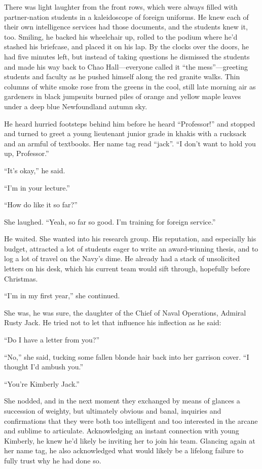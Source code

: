 \documentclass[11pt,a5paper]{article}
\begin{document}
There was light laughter from the front rows, which were always filled with partner-nation students in a kaleidoscope of foreign uniforms. He knew each of their own intelligence services had those documents, and the students knew it, too. Smiling, he backed his wheelchair up, rolled to the podium where he'd stashed his briefcase, and placed it on his lap. By the clocks over the doors, he had five minutes left, but instead of taking questions he dismissed the students and made his way back to Chao Hall---everyone called it ``the mess''---greeting students and faculty as he pushed himself along the red granite walks. Thin columns of white smoke rose from the greens in the cool, still late morning air as gardeners in black jumpsuits burned piles of orange and yellow maple leaves under a deep blue Newfoundland autumn sky.

He heard hurried footsteps behind him before he heard ``Professor!'' and stopped and turned to greet a young lieutenant junior grade in khakis with a rucksack and an armful of textbooks. Her name tag read ``{\sc jack}''. ``I don't want to hold you up, Professor.''

``It's okay,'' he said.

``I'm in your lecture.''

``How do like it so far?''

She laughed. ``Yeah, so far so good. I'm training for foreign service.''

He waited. She wanted into his research group. His reputation, and especially his budget, attracted a lot of students eager to write an award-winning thesis, and to log a lot of travel on the Navy's dime. He already had a stack of unsolicited letters on his desk, which his current team would sift through, hopefully before Christmas.

``I'm in my first year,'' she continued.

She was, he was sure, the daughter of the Chief of Naval Operations, Admiral Rusty Jack. He tried not to let that influence his inflection as he said:

``Do I have a letter from you?''

``No,'' she said, tucking some fallen blonde hair back into her garrison cover. ``I thought I'd ambush you.''

``You're Kimberly Jack.''

She nodded, and in the next moment they exchanged by means of glances a succession of weighty, but ultimately obvious and banal, inquiries and confirmations that they were both too intelligent and too interested in the arcane and sublime to articulate. Acknowledging an instant connection with young Kimberly, he knew he'd likely be inviting her to join his team. Glancing again at her name tag, he also acknowledged what would likely be a lifelong failure to fully trust why he had done so.
\end{document}
